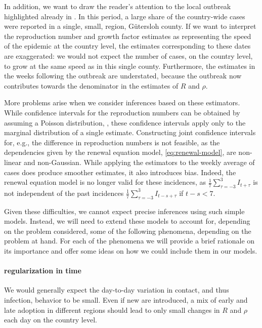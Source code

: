 In addition, we want to draw the reader's attention to the local outbreak highlighted already in . In this period, a large share of the country-wide cases were reported in a single, small, region, Gütersloh county. If we want to interpret the reproduction number and growth factor estimates as representing the speed of the epidemic at the country level, the estimates corresponding to these dates are exaggerated: we would not expect the number of cases, on the country level, to grow at the same speed as in this single county. Furthermore, the estimates in the weeks following the outbreak are understated, because the outbreak now contributes towards the denominator in the estimates of $R$ and $\rho$. 

More problems arise when we consider inferences based on these estimators. While confidence intervals for the reproduction numbers can be obtained by assuming a Poisson distribution, , these confidence intervals apply only to the marginal distribution of a single estimate. Constructing joint confidence intervals for, e.g., the difference in reproduction numbers is not feasible, as the dependencies given by the renewal equation model, \eqref{eq:renewal-model}, are non-linear and non-Gaussian. While applying the estimators to the weekly average of cases does produce smoother estimates, it also introduces bias. Indeed, the renewal equation model is no longer valid for these incidences, as $\frac{1}{7}\sum_{\tau = -3}^3 I_{t + \tau}$ is not independent of the past incidences $\frac{1}7 \sum_{\tau = -3 }^3 I_{t - s +\tau}$ if $t - s < 7$. 


Given these difficulties, we cannot expect precise inferences using such simple models. Instead, we will need to extend these models to account for, depending on the problem considered, some of the following phenomena, depending on the problem at hand. For each of the phenomena we will provide a brief rationale on its importance and offer some ideas on how we could include them in our models. 

\paragraph{regularization in time}
We would generally expect the day-to-day variation in contact, and thus infection, behavior to be small. Even if new  are introduced, a mix of early and late adoption in different regions should lead to only small changes in $R$ and $\rho$ each day on the country level. 

